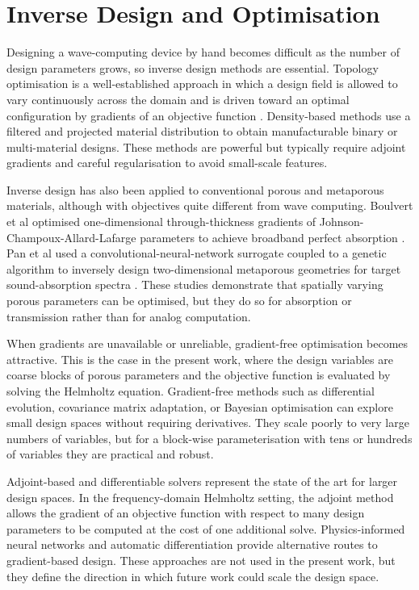 \section{Inverse Design and Optimisation}
\label{sec:lit_inverse}

Designing a wave-computing device by hand becomes difficult as the number of design parameters grows, so inverse design methods are essential. Topology optimisation is a well-established approach in which a design field is allowed to vary continuously across the domain and is driven toward an optimal configuration by gradients of an objective function \cite{zangenehnejad2021analogue}. Density-based methods use a filtered and projected material distribution to obtain manufacturable binary or multi-material designs. These methods are powerful but typically require adjoint gradients and careful regularisation to avoid small-scale features.

Inverse design has also been applied to conventional porous and metaporous materials, although with objectives quite different from wave computing. Boulvert et al optimised one-dimensional through-thickness gradients of Johnson-Champoux-Allard-Lafarge parameters to achieve broadband perfect absorption \cite{boulvert2019optimally}. Pan et al used a convolutional-neural-network surrogate coupled to a genetic algorithm to inversely design two-dimensional metaporous geometries for target sound-absorption spectra \cite{pan2023accelerated}. These studies demonstrate that spatially varying porous parameters can be optimised, but they do so for absorption or transmission rather than for analog computation.

When gradients are unavailable or unreliable, gradient-free optimisation becomes attractive. This is the case in the present work, where the design variables are coarse blocks of porous parameters and the objective function is evaluated by solving the Helmholtz equation. Gradient-free methods such as differential evolution, covariance matrix adaptation, or Bayesian optimisation can explore small design spaces without requiring derivatives. They scale poorly to very large numbers of variables, but for a block-wise parameterisation with tens or hundreds of variables they are practical and robust.

Adjoint-based and differentiable solvers represent the state of the art for larger design spaces. In the frequency-domain Helmholtz setting, the adjoint method allows the gradient of an objective function with respect to many design parameters to be computed at the cost of one additional solve. Physics-informed neural networks and automatic differentiation provide alternative routes to gradient-based design. These approaches are not used in the present work, but they define the direction in which future work could scale the design space.

